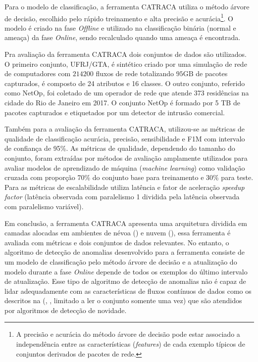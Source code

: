 Para o modelo de classificação, a ferramenta CATRACA utiliza o método árvore de
decisão, escolhido pelo rápido treinamento e alta precisão e acurácia\footnote{
    A precisão e acurácia do método árvore de decisão pode estar associado
    a independência entre as características (\emph{features}) de cada exemplo
    típicos de conjuntos derivados de pacotes de rede.
}.
O modelo é criado na fase \emph{Offline} e utilizado na classificação binária
(normal e ameaça) da fase \emph{Online}, sendo recalculado quando uma ameaça
é encontrada.

Pra avaliação da ferramenta CATRACA dois conjuntos de dados são utilizados.
O primeiro conjunto, UFRJ/GTA, é sintético criado por uma simulação de rede de
computadores com $214200$ fluxos de rede totalizando $95 \mathrm{GB}$ de pacotes capturados,
é composto de 24 atributos e 16 classes.
O outro conjunto, referido como NetOp, foi coletado de um operador de rede que
atende 373 residências na cidade do Rio de Janeiro em 2017.
O conjunto NetOp é formado por 5 TB de pacotes capturados e etiquetados por um
detector de intrusão comercial.

Também para a avaliação da ferramenta CATRACA, utilizou-se as métricas de qualidade
de classificação acurácia, precisão, sensibilidade e F1M com intervalo de
confiança de 95\%.
As métricas de qualidade, dependendo do tamanho do conjunto, foram extraídas por
métodos de avaliação amplamente utilizados para avaliar modelos de aprendizado
de máquina (\emph{machine learning}) como validação cruzada com proporção
70\% do conjunto base para treinamento e 30\% para teste.
Para as métricas de escalabilidade utiliza latência e fator de aceleração
\emph{speedup factor} (latência observada com paralelismo 1 dividida pela
latência observada com paralelismo variável).

Em conclusão, a ferramenta CATRACA apresenta uma arquitetura dividida em camadas
alocadas em ambientes de névoa (\fog) e nuvem (\cloud), essa ferramenta é
avaliada com métricas e dois conjuntos de dados relevantes.
No entanto, o algoritmo de detecção de anomalias desenvolvido para a ferramenta
consiste de um modelo de classificação pelo método árvore de decisão e
a atualização do modelo durante a fase \emph{Online} depende de todos os exemplos do
último intervalo de atualização.
Esse tipo de algoritmo de detecção de anomalias não é capaz de lidar
adequadamente com as características de fluxos contínuos de dados como os
descritos na  (\drift, \evolution, limitado a ler o conjunto somente
uma vez) que são atendidos por algoritmos de detecção de novidade.


